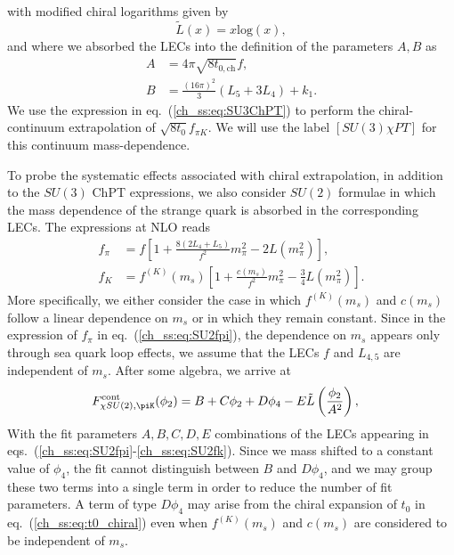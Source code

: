 with modified chiral logarithms given by
\begin{equation}
\label{ch_ss:eq:log}
\tilde{L}(x)=x{\textrm{log}}\left(x\right),
\end{equation}
and where we absorbed the LECs into the definition of the parameters $A,B$ as
\begin{align}
A&=4\pi\sqrt{8t_{0,\textrm{ch}}}f, \\
B&=\frac{(16\pi)^2}{3}(L_5+3L_4)+k_1.
\end{align} 
We use the expression in eq.~(\ref{ch_ss:eq:SU3ChPT}) to perform the chiral-continuum extrapolation of $\sqrt{8t_0}f_{\pi K}$. We will use the label $[SU(3)\chi PT]$ for this continuum mass-dependence. 

To probe the systematic effects associated with chiral extrapolation, in addition to the $SU(3)$ ChPT expressions, we also consider $SU(2)$ formulae in which the mass dependence of the strange quark is absorbed 
in the corresponding LECs. The expressions at NLO reads~\citep{SU2}
\begin{align}
\label{ch_ss:eq:SU2fpi}
f_{\pi}&=f\left[1+\frac{8(2L_4+L_5)}{f^2}m_{\pi}^2-2L(m_{\pi}^2)\right], \\
\label{ch_ss:eq:SU2fk}
f_K&=f^{(K)}(m_s)\left[1+\frac{c(m_s)}{f^2}m_{\pi}^2-\frac{3}{4}L(m_{\pi}^2)\right].
\end{align}
More specifically, we either consider the case in which $f^{(K)}(m_s)$ and $c(m_s)$ follow a linear dependence on $m_s$ or in which they remain constant. Since in the expression of $f_{\pi}$ in eq.~(\ref{ch_ss:eq:SU2fpi}), the dependence on $m_s$ appears only through sea quark loop effects, we assume that the LECs $f$ and $L_{4,5}$ are independent of $m_s$. After some algebra, we arrive at
\begin{align}
\label{ch_ss:eq:SU2pik}
F_{\chi SU(2),\piK}^{\textrm{cont}}(\phi_2)&=B+C\phi_2+D\phi_4-E\tilde{L}\left(\frac{\phi_2}{A^2}\right),
\end{align}
With the fit parameters $A,B,C,D,E$ combinations of the LECs appearing in eqs.~(\ref{ch_ss:eq:SU2fpi}-\ref{ch_ss:eq:SU2fk}). Since we mass shifted to a constant value of $\phi_4$, the fit cannot distinguish between $B$ and $D\phi_4$, and we may group these two terms into a single term in order to reduce the number of fit parameters. A term of type $D\phi_4$ may arise from the chiral expansion of $t_0$ in eq.~(\ref{ch_ss:eq:t0_chiral}) even when $f^{(K)}(m_s)$ and $c(m_s)$ are considered to be independent of $m_s$.

